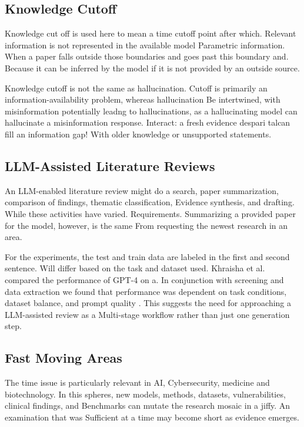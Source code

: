 \documentclass[acmsmall,screen]{acmart}
\begin{document}
\subsection{Knowledge Cutoff}

Knowledge cut off is used here to mean a time cutoff point after which.
Relevant information is not represented in the available model
Parametric information. When a paper falls outside those boundaries and goes past this boundary and.
Because it can be inferred by the model if it is not provided by an outside source.

Knowledge cutoff is not the same as hallucination. Cutoff is
primarily an information-availability problem, whereas hallucination
Be intertwined, with misinformation potentially leadng to hallucinations, as a hallucinating model can hallucinate a misinformation response.
Interact: a fresh evidence despari talcan fill an information gap!
With older knowledge or unsupported statements.

\subsection{LLM-Assisted Literature Reviews}

An LLM-enabled literature review might do a search,
paper summarization, comparison of findings, thematic classification,
Evidence synthesis, and drafting. While these activities have varied.
Requirements. Summarizing a provided paper for the model, however, is the same
From requesting the newest research in an area.

For the experiments, the test and train data are labeled in the first and second sentence.
Will differ based on the task and dataset used. Khraisha et al. compared the performance of GPT-4 on a.
In conjunction with screening and data extraction we found that performance was dependent on
task conditions, dataset balance, and prompt quality
\cite{khraisha2024}. This suggests the need for approaching a LLM-assisted review as a
Multi-stage workflow rather than just one generation step.

\subsection{Fast Moving Areas}

The time issue is particularly relevant in AI,
Cybersecurity, medicine and biotechnology. In this spheres, new
models, methods, datasets, vulnerabilities, clinical findings, and
Benchmarks can mutate the research mosaic in a jiffy. An examination that was
Sufficient at a time may become short as evidence emerges.
\end{document}
